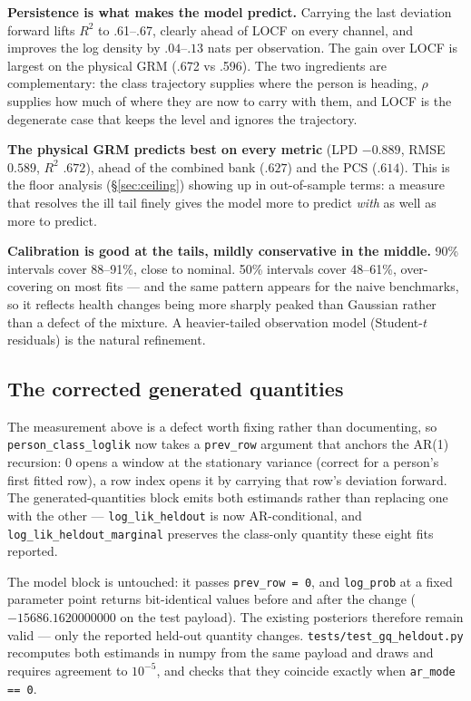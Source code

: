 \documentclass[11pt]{article}
\newcommand{\code}[1]{\texttt{\small #1}}
\begin{document}
\textbf{Persistence is what makes the model predict.} Carrying the last
deviation forward lifts $R^2$ to .61--.67, clearly ahead of LOCF on every
channel, and improves the log density by $.04$--$.13$ nats per observation.
The gain over LOCF is largest on the physical GRM (.672 vs .596). The two
ingredients are complementary: the class trajectory supplies where the
person is heading, $\rho$ supplies how much of where they are now to carry
with them, and LOCF is the degenerate case that keeps the level and ignores
the trajectory.

\textbf{The physical GRM predicts best on every metric} (LPD $-0.889$, RMSE
$0.589$, $R^2$ $.672$), ahead of the combined bank ($.627$) and the PCS
($.614$). This is the floor analysis (\S\ref{sec:ceiling}) showing up in
out-of-sample terms: a measure that resolves the ill tail finely gives the
model more to predict \emph{with} as well as more to predict.

\textbf{Calibration is good at the tails, mildly conservative in the
middle.} 90\% intervals cover 88--91\%, close to nominal. 50\% intervals
cover 48--61\%, over-covering on most fits --- and the same pattern appears
for the naive benchmarks, so it reflects health changes being more sharply
peaked than Gaussian rather than a defect of the mixture. A heavier-tailed
observation model (Student-$t$ residuals) is the natural refinement.

\subsection*{The corrected generated quantities}
\label{sec:gqfix}

The measurement above is a defect worth fixing rather than documenting, so
\code{person\_class\_loglik} now takes a \code{prev\_row} argument that
anchors the AR(1) recursion: $0$ opens a window at the stationary variance
(correct for a person's first fitted row), a row index opens it by carrying
that row's deviation forward. The generated-quantities block emits both
estimands rather than replacing one with the other ---
\code{log\_lik\_heldout} is now AR-conditional, and
\code{log\_lik\_heldout\_marginal} preserves the class-only quantity these
eight fits reported.

The model block is untouched: it passes \code{prev\_row = 0}, and
\code{log\_prob} at a fixed parameter point returns bit-identical values
before and after the change ($-15686.1620000000$ on the test payload). The
existing posteriors therefore remain valid --- only the reported held-out
quantity changes. \code{tests/test\_gq\_heldout.py} recomputes both
estimands in numpy from the same payload and draws and requires agreement to
$10^{-5}$, and checks that they coincide exactly when \code{ar\_mode == 0}.
\end{document}
